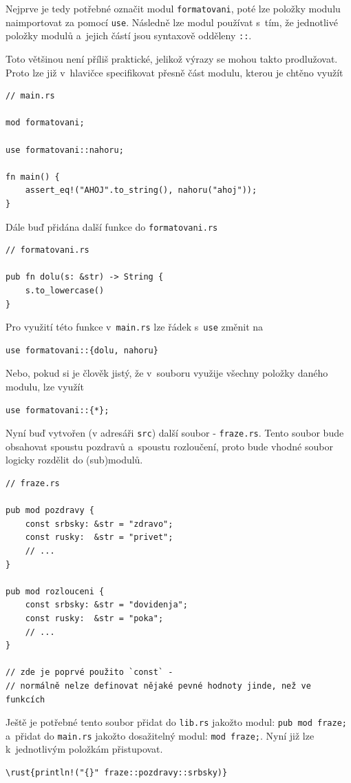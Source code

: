 \documentclass[a4paper, 12pt]{article} %
\newcommand{\rust}[1]{\texttt{#1}}
\begin{document}
		Nejprve je tedy potřebné označit modul \rust{formatovani}, poté lze položky modulu naimportovat za pomocí \rust{use}. Následně lze modul používat s~tím, že jednotlivé položky modulů a~jejich částí jsou syntaxově odděleny \rust{::}.
		
		Toto většinou není příliš praktické, jelikož výrazy se mohou takto prodlužovat. Proto lze již v~hlavičce specifikovat přesně část modulu, kterou je chtěno využít
		\begin{verbatim}
// main.rs

mod formatovani;

use formatovani::nahoru;

fn main() {
	assert_eq!("AHOJ".to_string(), nahoru("ahoj"));
}
		\end{verbatim}
		
		Dále buď přidána další funkce do \texttt{formatovani.rs}
		\begin{verbatim}
// formatovani.rs

pub fn dolu(s: &str) -> String {
	s.to_lowercase()
}
		\end{verbatim}
		
		Pro využití této funkce v~\texttt{main.rs} lze řádek s~\rust{use} změnit na
		\begin{verbatim}
use formatovani::{dolu, nahoru}
		\end{verbatim}
		
		Nebo, pokud si je člověk jistý, že v~souboru využije všechny položky daného modulu, lze využít
		\begin{verbatim}
use formatovani::{*};
		\end{verbatim}
		
		Nyní buď vytvořen (v adresáři \texttt{src}) další soubor - \texttt{fraze.rs}. Tento soubor bude obsahovat spoustu pozdravů a~spoustu rozloučení, proto bude vhodné soubor logicky rozdělit do (sub)modulů.
		\begin{verbatim}
// fraze.rs

pub mod pozdravy {
	const srbsky: &str = "zdravo";
	const rusky:  &str = "privet";
	// ...
}

pub mod rozlouceni {
	const srbsky: &str = "dovidenja";
	const rusky:  &str = "poka";
	// ...
}

// zde je poprvé použito `const` - 
// normálně nelze definovat nějaké pevné hodnoty jinde, než ve funkcích
		\end{verbatim}
		
		Ještě je potřebné tento soubor přidat do \texttt{lib.rs} jakožto modul: \rust{pub mod fraze;} a~přidat do \texttt{main.rs} jakožto dosažitelný modul: \rust{mod fraze;}. Nyní již lze k~jednotlivým položkám přistupovat.
		\begin{verbatim}
\rust{println!("{}" fraze::pozdravy::srbsky)}
		\end{verbatim}
		
\end{document}
